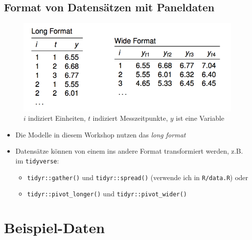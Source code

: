\documentclass[
]{book}
\providecommand{\tightlist}{%
  \setlength{\itemsep}{0pt}\setlength{\parskip}{0pt}}
\begin{document}
\hypertarget{format-von-datensuxe4tzen-mit-paneldaten}{%
\subsection*{Format von Datensätzen mit Paneldaten}\label{format-von-datensuxe4tzen-mit-paneldaten}}

\begin{figure}
\centering
\includegraphics{figs/longwide.png}
\caption{\(i\) indiziert Einheiten, \(t\) indiziert Messzeitpunkte, \(y\) ist eine Variable}
\end{figure}

\begin{itemize}
\item
  Die Modelle in diesem Workshop nutzen das \emph{long format}
\item
  Datensätze können von einem ins andere Format transformiert werden, z.B. im \texttt{tidyverse}:

  \begin{itemize}
  \tightlist
  \item
    \texttt{tidyr::gather()} und \texttt{tidyr::spread()} (verwende ich in \texttt{R/data.R}) oder
  \item
    \texttt{tidyr::pivot\_longer()} und \texttt{tidyr::pivot\_wider()}
  \end{itemize}
\end{itemize}

\hypertarget{beispiel-daten}{%
\section{Beispiel-Daten}\label{beispiel-daten}}
\end{document}
